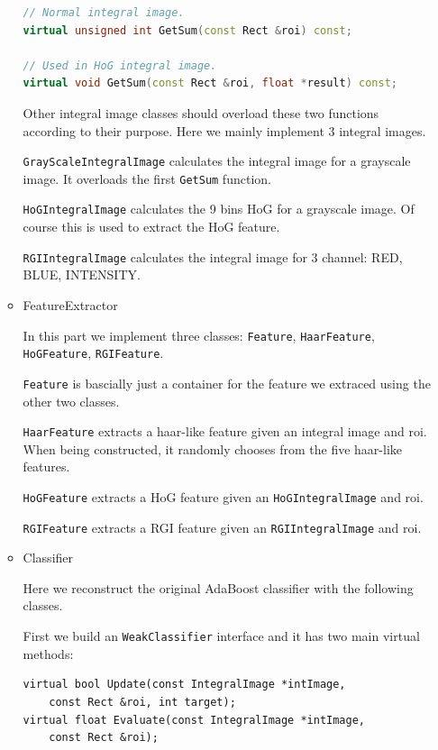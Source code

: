 \documentclass[a4paper]{article}
\begin{document}
\begin{enumerate}
\begin{itemize}
\begin{lstlisting}[language=C++]
// Normal integral image.
virtual unsigned int GetSum(const Rect &roi) const;

// Used in HoG integral image.
virtual void GetSum(const Rect &roi, float *result) const;
\end{lstlisting}

Other integral image classes should overload these two functions according to their purpose. Here we mainly implement 3 integral images.

\lstinline{GrayScaleIntegralImage} calculates the integral image for a grayscale image. It overloads the first \lstinline{GetSum} function.

\lstinline{HoGIntegralImage} calculates the 9 bins HoG for a grayscale image. Of course this is used to extract the HoG feature.

\lstinline{RGIIntegralImage} calculates the integral image for 3 channel: RED, BLUE, INTENSITY.

\item FeatureExtractor

In this part we implement three classes: \lstinline{Feature}, \lstinline{HaarFeature}, \lstinline{HoGFeature}, \lstinline{RGIFeature}.

\lstinline{Feature} is bascially just a container for the feature we extraced using the other two classes.

\lstinline{HaarFeature} extracts a haar-like feature given an integral image and roi. When being constructed, it randomly chooses from the five haar-like features.

\lstinline{HoGFeature} extracts a HoG feature given an \lstinline{HoGIntegralImage} and roi.

\lstinline{RGIFeature} extracts a RGI feature given an \lstinline{RGIIntegralImage} and roi.

\item Classifier

Here we reconstruct the original AdaBoost classifier with the following classes.

First we build an \lstinline{WeakClassifier} interface and it has two main virtual methods:

\begin{lstlisting}
virtual bool Update(const IntegralImage *intImage, 
	const Rect &roi, int target);
virtual float Evaluate(const IntegralImage *intImage, 
	const Rect &roi);
\end{lstlisting}


\end{itemize}
\end{enumerate}
\end{document}
